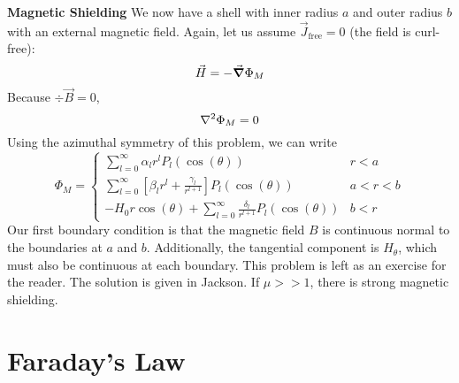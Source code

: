 \documentclass[a4paper,twoside,master.tex]{subfiles}
\begin{document}
\begin{ex}
    \textbf{Magnetic Shielding}
    We now have a shell with inner radius $ a $ and outer radius $ b $ with an external magnetic field. Again, let us assume $ \vec{J}_{\text{free}} = 0 $ (the field is curl-free):
    \begin{equation}
        \vec{H} = - \grad{\Phi_M}
    \end{equation}
    Because $ \div{ \vec{B}} = 0 $,
    \begin{equation}
        \laplacian{\Phi_M} = 0
    \end{equation}
    Using the azimuthal symmetry of this problem, we can write
    \begin{equation}
        \Phi_M = 
        \begin{cases}
            \sum_{l=0}^{\infty} \alpha_l r^l P_l(\cos(\theta)) & r<a\\
            \sum_{l=0}^{\infty} \left[ \beta_l r^l + \frac{\gamma_l}{r^{l+1}} \right]P_l(\cos(\theta)) & a<r<b\\
            -H_0 r \cos(\theta) + \sum_{l=0}^{\infty} \frac{\delta_l}{r^{l+1}} P_l(\cos(\theta)) & b<r
        \end{cases}
    \end{equation}
    Our first boundary condition is that the magnetic field $ B $ is continuous normal to the boundaries at $ a $ and $ b $. Additionally, the tangential component is $ H_\theta $, which must also be continuous at each boundary. This problem is left as an exercise for the reader. The solution is given in Jackson. If $ \mu >> 1 $, there is strong magnetic shielding.
\end{ex}

\section{Faraday's Law}
\label{sec:faradays_law}
\end{document}
